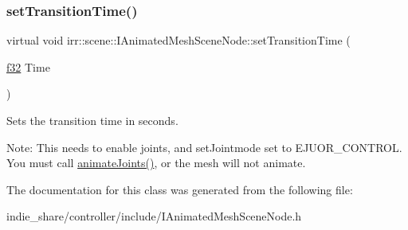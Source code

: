 \subsubsection{\texorpdfstring{set\+Transition\+Time()}{setTransitionTime()}\hspace{0.1cm}{\footnotesize\ttfamily [2/2]}}
{\footnotesize\ttfamily virtual void irr\+::scene\+::\+I\+Animated\+Mesh\+Scene\+Node\+::set\+Transition\+Time (\begin{DoxyParamCaption}\item[{\hyperlink{namespaceirr_a0277be98d67dc26ff93b1a6a1d086b07}{f32}}]{Time }\end{DoxyParamCaption})\hspace{0.3cm}{\ttfamily [pure virtual]}}



Sets the transition time in seconds. 

Note\+: This needs to enable joints, and set\+Jointmode set to E\+J\+U\+O\+R\+\_\+\+C\+O\+N\+T\+R\+OL. You must call \hyperlink{classirr_1_1scene_1_1IAnimatedMeshSceneNode_a76af2c9a2b0cea6ee2b3559c1f32f850}{animate\+Joints()}, or the mesh will not animate. 

The documentation for this class was generated from the following file\+:\begin{DoxyCompactItemize}
\item 
indie\+\_\+share/controller/include/I\+Animated\+Mesh\+Scene\+Node.\+h\end{DoxyCompactItemize}
